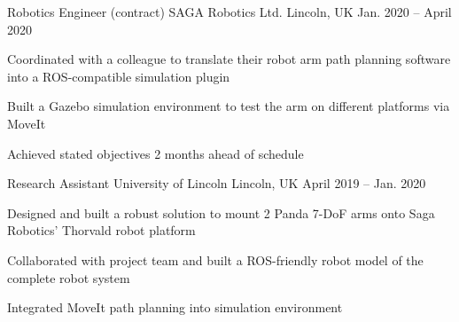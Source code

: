\documentclass[11pt,a4paper]{awesome-cv}        %
\begin{document}
\begin{cventries}
  \cventry
  {Robotics Engineer (contract)}
  {SAGA Robotics Ltd.}
  {Lincoln, UK}
  {Jan. 2020 -- April 2020}
  {
    \begin{cvitems}
      \item Coordinated with a colleague to translate their robot arm path planning software into a ROS-compatible simulation plugin 
      \item Built a Gazebo simulation environment to test the arm on different platforms via MoveIt
      \item Achieved stated objectives 2 months ahead of schedule
    \end{cvitems}
  }
  \cventry
  {Research Assistant}
  {University of Lincoln}
  {Lincoln, UK}
  {April 2019 -- Jan. 2020}
  {
    \begin{cvitems}
      \item Designed and built a robust solution to mount 2 Panda 7-DoF arms onto Saga Robotics' Thorvald robot platform
      \item Collaborated with project team and built a ROS-friendly robot model of the complete robot system 
      \item Integrated MoveIt path planning into simulation environment
    \end{cvitems}
  }
\end{cventries}

\end{document}
